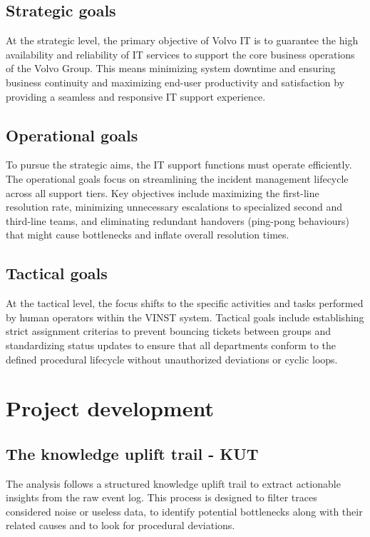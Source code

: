 \documentclass[11pt,a4paper]{article}
\begin{document}
\subsection{Strategic goals}
At the strategic level, the primary objective of Volvo IT is to guarantee the high availability and reliability of IT services to support the core business operations of the Volvo Group. This means minimizing system downtime and ensuring business continuity and maximizing end-user productivity and satisfaction by providing a seamless and responsive IT support experience.

\subsection{Operational goals}
To pursue the strategic aims, the IT support functions must operate efficiently. The operational goals focus on streamlining the incident management lifecycle across all support tiers. Key objectives include maximizing the first-line resolution rate, minimizing unnecessary escalations to specialized second and third-line teams, and eliminating redundant handovers (ping-pong behaviours) that might cause bottlenecks and inflate overall resolution times.

\subsection{Tactical goals}
At the tactical level, the focus shifts to the specific activities and tasks performed by human operators within the VINST system. Tactical goals include establishing strict assignment criterias to prevent bouncing tickets between groups and standardizing status updates to ensure that all departments conform to the defined procedural lifecycle without unauthorized deviations or cyclic loops.

\newpage

\section{Project development}

\subsection{The knowledge uplift trail - KUT}
The analysis follows a structured knowledge uplift trail to extract actionable insights from the raw event log. This process is designed to filter traces considered noise or useless data, to identify potential bottlenecks along with their related causes and to look for procedural deviations.
\end{document}
